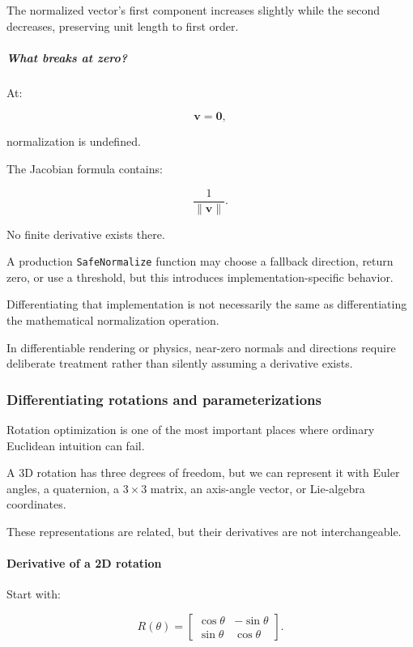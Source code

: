 The normalized vector's first component increases slightly while the second decreases, preserving unit length to first order.

\subparagraph{What breaks at zero?}\label{what-breaks-at-zero}

At:

\[
\mathbf v=\mathbf0,
\]

normalization is undefined.

The Jacobian formula contains:

\[
\frac1{\|\mathbf v\|}.
\]

No finite derivative exists there.

A production \texttt{SafeNormalize} function may choose a fallback direction, return zero, or use a threshold, but this introduces implementation-specific behavior.

Differentiating that implementation is not necessarily the same as differentiating the mathematical normalization operation.

In differentiable rendering or physics, near-zero normals and directions require deliberate treatment rather than silently assuming a derivative exists.

\subsubsection{Differentiating rotations and parameterizations}\label{differentiating-rotations-and-parameterizations}

Rotation optimization is one of the most important places where ordinary Euclidean intuition can fail.

A 3D rotation has three degrees of freedom, but we can represent it with Euler angles, a quaternion, a \(3\times3\) matrix, an axis-angle vector, or Lie-algebra coordinates.

These representations are related, but their derivatives are not interchangeable.

\paragraph{Derivative of a 2D rotation}\label{derivative-of-a-2d-rotation}

Start with:

\[
R(\theta)= \begin{bmatrix} \cos\theta&-\sin\theta\\ \sin\theta&\cos\theta \end{bmatrix}.
\]

